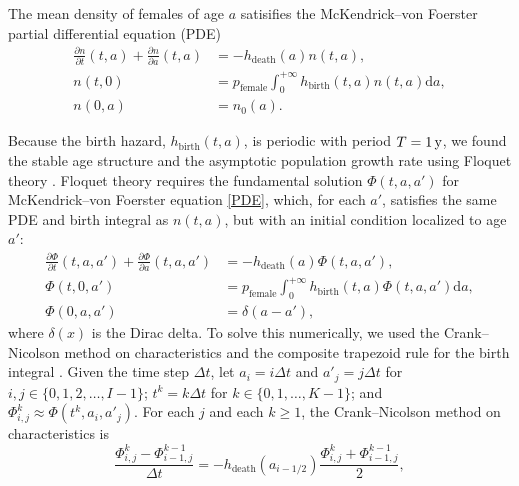 \documentclass[12pt]{article}
\newcommand{\md}{\mathrm{d}}
\begin{document}
The mean density of females of age $a$ satisifies the McKendrick--von
Foerster partial differential equation (PDE)
\begin{equation}
  \label{PDE}
  \begin{split}
    \frac{\partial n}{\partial t}(t, a)
    + \frac{\partial n}{\partial a}(t, a)
    &= - h_{\text{death}}(a) n(t, a),
    \\
    n(t, 0) &=
    p_{\text{female}}
    \int_0^{+\infty} h_{\text{birth}}(t, a) n(t, a) \md a,
    \\
    n(0, a) &= n_0(a).
  \end{split}
\end{equation}

Because the birth hazard, $h_{\text{birth}}(t, a)$,
is periodic with period $T = \unit[1]{y}$,
we found the stable age structure and the asymptotic population growth
rate using Floquet theory \citep{parker_1992}.
Floquet theory requires the fundamental solution $\Phi(t, a, a')$ for
McKendrick--von Foerster equation \eqref{PDE}, which, for each $a'$,
satisfies the same PDE and birth integral as
$n(t, a)$, but with an initial condition localized to age $a'$:
\begin{equation}
  \label{fundamental_PDE}
  \begin{split}
    \frac{\partial \Phi}{\partial t}(t, a, a')
    + \frac{\partial \Phi}{\partial a}(t, a, a')
    &= - h_{\text{death}}(a) \Phi(t, a, a'),
    \\
    \Phi(t, 0, a') &=
    p_{\text{female}}
    \int_0^{+\infty} h_{\text{birth}}(t, a) \Phi(t, a, a') \md a,
    \\
    \Phi(0, a, a') &= \delta(a - a'),
  \end{split}
\end{equation}
where $\delta(x)$ is the Dirac delta.
To solve this numerically, we used the
Crank--Nicolson method on characteristics and the composite trapezoid
rule for the birth integral \citep{milner_1992}.  Given the time
step $\Delta t$,
let $a_i = i \Delta t$
and $a'_j = j \Delta t$
for $i, j \in \{0, 1, 2, \ldots, I - 1\}$;
$t^k = k \Delta t$
for $k \in \{0, 1, \ldots, K - 1\}$;
and $\Phi_{i, j}^k \approx \Phi(t^k, a_i, a'_j)$.
For each $j$ and each $k \geq 1$, the Crank--Nicolson method on
characteristics is
\begin{equation}
  \label{CN_step}
  \frac{\Phi_{i, j}^k - \Phi_{i - 1, j}^{k - 1}}{\Delta t}
  = - h_{\text{death}}(a_{i - 1 / 2})
  \frac{\Phi_{i, j}^k + \Phi_{i - 1, j}^{k - 1}}{2},
\end{equation}
\end{document}
